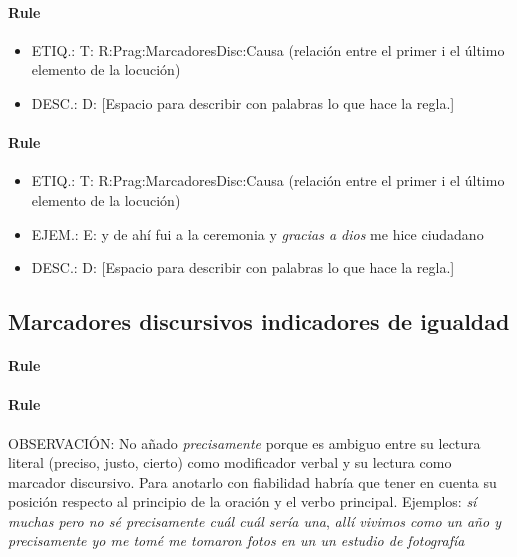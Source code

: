 \documentclass[11pt]{report}
\begin{document}
\paragraph*{Rule}
\begin{itemize}
\item ETIQ.:  T: R:Prag:MarcadoresDisc:Causa (relación entre el primer i el último elemento de la locución)
\item DESC.:  D: [Espacio para describir con palabras lo que hace la regla.]
\end{itemize}

\paragraph*{Rule}
\begin{itemize}
\item ETIQ.:  T: R:Prag:MarcadoresDisc:Causa (relación entre el primer i el último elemento de la locución)
\item EJEM.:  E: y de ahí fui a la ceremonia y \emph{gracias a dios} me hice ciudadano
\item DESC.:  D: [Espacio para describir con palabras lo que hace la regla.]
\end{itemize}

\subsection{Marcadores discursivos indicadores de igualdad}
\paragraph*{Rule}
\paragraph*{Rule}
OBSERVACIÓN: No añado \emph{precisamente} porque es ambiguo entre su lectura literal (preciso, justo, cierto) como modificador verbal y su lectura como marcador discursivo. Para anotarlo con fiabilidad habría que tener en cuenta su posición respecto al principio de la oración y el verbo principal. Ejemplos: \emph{sí muchas pero no sé precisamente cuál cuál sería una}, \emph{allí vivimos como un año y precisamente yo me tomé me tomaron fotos en un un estudio de fotografía}
\end{document}
